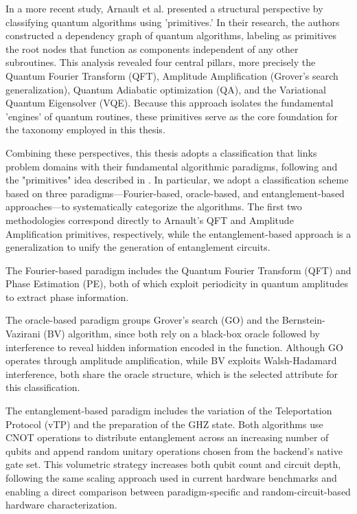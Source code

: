 \documentclass{article}
\begin{document}
In a more recent study, Arnault et al. \cite{arnaultTypologyQuantumAlgorithms_2024} presented a structural perspective by classifying quantum algorithms using 'primitives.' In their research, the authors constructed a dependency graph of quantum algorithms, labeling as primitives the root nodes that function as components independent of any other subroutines. This analysis revealed four central pillars, more precisely the Quantum Fourier Transform (QFT), Amplitude Amplification (Grover's search generalization), Quantum Adiabatic optimization (QA), and the Variational Quantum Eigensolver (VQE). Because this approach isolates the fundamental 'engines' of quantum routines, these primitives serve as the core foundation for the taxonomy employed in this thesis.

Combining these perspectives, this thesis adopts a classification that links problem domains with their fundamental algorithmic paradigms, following \cite{jQuantumAlgorithmImplementations_2022} and the "primitives" idea described in \cite{arnaultTypologyQuantumAlgorithms_2024}. In particular, we adopt a classification scheme based on three paradigms---Fourier-based, oracle-based, and entanglement-based approaches---to systematically categorize the algorithms. The first two methodologies correspond directly to Arnault's QFT and Amplitude Amplification primitives, respectively, while the entanglement-based approach is  a generalization to unify the generation of entanglement circuits.

The Fourier-based paradigm includes the Quantum Fourier Transform (QFT) and Phase Estimation (PE), both of which exploit periodicity in quantum amplitudes to extract phase information.

The oracle-based paradigm groups Grover's search (GO) and the Bernstein-Vazirani (BV) algorithm, since both rely on a black-box oracle followed by interference to reveal hidden information encoded in the function. Although GO operates through amplitude amplification, while BV exploits Walsh-Hadamard interference, both share the oracle structure, which is the selected attribute for this classification.

The entanglement-based paradigm includes the variation of the Teleportation Protocol (vTP) and the preparation of the GHZ state. Both algorithms use CNOT operations to distribute entanglement across an increasing number of qubits and append random unitary operations chosen from the backend's native gate set. This volumetric strategy increases both qubit count and circuit depth, following the same scaling approach used in current hardware benchmarks and enabling a direct comparison between paradigm-specific and random-circuit-based hardware characterization.
\end{document}
